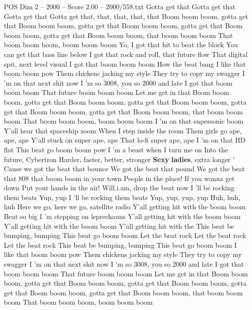 \begin{textsample}{POS Dim 2 – 2000 – Score 2.00 – 2000/558.txt}  \label{ex:f2_pos_008}
Gotta get that Gotta get that Gotta get that Gotta get that, that, that, that, that Boom boom boom, gotta get that Boom boom boom, gotta get that Boom boom boom, gotta get that Boom boom boom, gotta get that Boom boom boom, that boom boom boom That boom boom boom, boom boom boom Yo, I got that hit to beat the block You can get that bass line below I got that rock and roll, that future flow That digital spit, next level visual I got that boom boom boom How the beat bang I like that boom boom pow Them chickens jacking my style They try to copy my swagger I 'm on that next shit now I 'm so 3008, you so 2000 and late I got that boom boom boom That future boom boom boom Let me get in that Boom boom boom, gotta get that Boom boom boom, gotta get that Boom boom boom, gotta get that Boom boom boom, gotta get that Boom boom boom, that boom boom boom That boom boom boom, boom boom boom I 'm on that supersonic boom Y'all hear that spaceship zoom When I step inside the room Them girls go ape, ape, ape Y'all stuck on super ape, ape That lo-fi super ape, ape I 'm on that HD flat This beat go boom boom pow I 'm a beast when I turn me on Into the future, Cybertron Harder, faster, better, stronger \textbf{Sexy} \textbf{ladies}, extra longer ' Cause we got the beat that bounce We got the beat that pound We got the beat that 808 that boom boom in your town People in the place!
If you wanna get down Put your hands in the air!
Will.i.am, drop the beat now I 'll be rocking them beats Yup, yup I 'll be rocking them beats Yup, yup, yup, yup Huh, huh, huh Here we go, here we go, satellite radio Y'all getting hit with the boom boom Beat so big I 'm stepping on leprechauns Y'all getting hit with the boom boom Y'all getting hit with the boom boom Y'all getting hit with the This beat be bumping, bumping This beat go boom boom Let the beat rock Let the beat rock Let the beat rock This beat be bumping, bumping This beat go boom boom I like that boom boom pow Them chickens jacking my style They try to copy my swagger I 'm on that next shit now I 'm so 3008, you so 2000 and late I got that boom boom boom That future boom boom boom Let me get in that Boom boom boom, gotta get that Boom boom boom, gotta get that Boom boom boom, gotta get that Boom boom boom, gotta get that Boom boom boom, that boom boom boom That boom boom boom, boom boom boom

\end{textsample}
